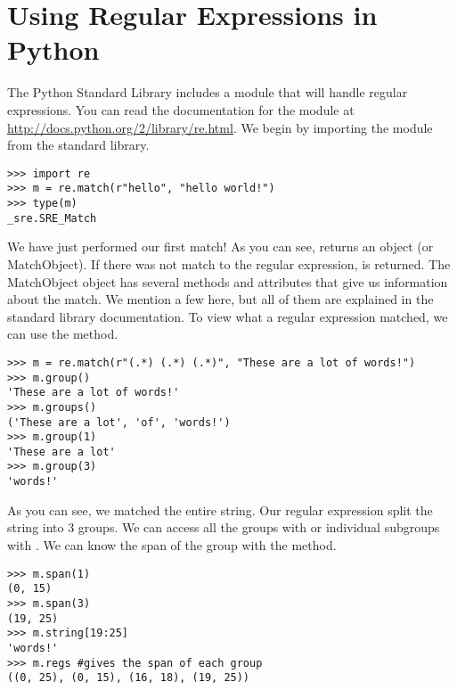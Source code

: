\section*{Using Regular Expressions in Python}
The Python Standard Library includes a module that will handle regular expressions.
You can read the documentation for the module at \url{http://docs.python.org/2/library/re.html}.
We begin by importing the  module from the standard library.
\begin{lstlisting}
>>> import re
>>> m = re.match(r"hello", "hello world!")
>>> type(m)
_sre.SRE_Match
\end{lstlisting}
We have just performed our first match!  As you can see,  returns an  object (or MatchObject).
If there was not match to the regular expression,  is returned.
The MatchObject object has several methods and attributes that give us information about the match.
We mention a few here, but all of them are explained in the standard library documentation.
To view what a regular expression matched, we can use the  method.
\begin{lstlisting}
>>> m = re.match(r"(.*) (.*) (.*)", "These are a lot of words!")
>>> m.group()
'These are a lot of words!'
>>> m.groups()
('These are a lot', 'of', 'words!')
>>> m.group(1)
'These are a lot'
>>> m.group(3)
'words!'
\end{lstlisting}
As you can see, we matched the entire string.  Our regular expression split the string into 3 groups.
We can access all the groups with  or individual subgroups with .
We can know the span of the group with the  method.
\begin{lstlisting}
>>> m.span(1)
(0, 15)
>>> m.span(3)
(19, 25)
>>> m.string[19:25]
'words!'
>>> m.regs #gives the span of each group
((0, 25), (0, 15), (16, 18), (19, 25))
\end{lstlisting}





